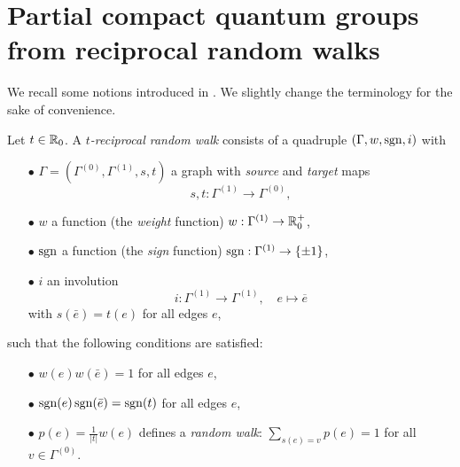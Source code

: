 



\section{Partial compact quantum groups from reciprocal random walks}

We recall some notions introduced in \cite{DCY1}. We slightly change the terminology for the sake of convenience.


\begin{Def} Let $t\in \mathbb{R}_0$. A \emph{$t$-reciprocal random walk} consists of a quadruple $(\Gamma,w,\operatorname{\mathrm{sgn}},i)$ with \begin{itemize}
\item[$\bullet$] $\Gamma=(\Gamma^{(0)},\Gamma^{(1)},s,t)$ a graph with \emph{source} and \emph{target} maps \[s,t:\Gamma^{(1)}\rightarrow \Gamma^{(0)},\]
\item[$\bullet$] $w$ a function (the \emph{weight} function) $w:\Gamma^{(1)}\rightarrow \mathbb{R}_0^+$,
\item[$\bullet$] $\operatorname{\mathrm{sgn}}$ a function (the \emph{sign} function) $\operatorname{\mathrm{sgn}}:\Gamma^{(1)}\rightarrow \{\pm 1\}$,
\item[$\bullet$] $i$ an involution \[i:\Gamma^{(1)} \rightarrow \Gamma^{(1)},\quad e\mapsto \overline{e}\] with $s(\bar{e}) = t(e)$ for all edges $e$,
\end{itemize}
such that the following conditions are satisfied:
\begin{itemize}
\item[$\bullet$] $w(e)w(\bar{e}) = 1$ for all edges $e$,
\item[$\bullet$] $\operatorname{\mathrm{sgn}}(e)\operatorname{\mathrm{sgn}}(\bar{e}) = \operatorname{\mathrm{sgn}}(t)$ for all edges $e$,
\item[$\bullet$] $p(e) = \frac{1}{|t|}w(e)$ defines a \emph{random walk}:   $\sum_{s(e)=v} p(e) = 1$ for all $v\in \Gamma^{(0)}$.
\end{itemize}
\end{Def}

